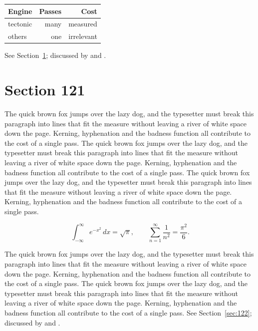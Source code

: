 \documentclass{article}
\begin{document}
\begin{center}
\begin{tabular}{lrr}
\toprule
Engine & Passes & Cost \\
\midrule
tectonic & many & measured \\
others & one & irrelevant \\
\bottomrule
\end{tabular}
\end{center}

See Section~\ref{sec:121}; discussed by \textcite{k1} and \textcite{l3}.
\section{Section 121}
\label{sec:121}
The quick brown fox jumps over the lazy dog, and the typesetter must break this paragraph into lines that fit the measure without leaving a river of white space down the page. Kerning, hyphenation and the badness function all contribute to the cost of a single pass. The quick brown fox jumps over the lazy dog, and the typesetter must break this paragraph into lines that fit the measure without leaving a river of white space down the page. Kerning, hyphenation and the badness function all contribute to the cost of a single pass. The quick brown fox jumps over the lazy dog, and the typesetter must break this paragraph into lines that fit the measure without leaving a river of white space down the page. Kerning, hyphenation and the badness function all contribute to the cost of a single pass. 

\begin{equation}\label{eq:121}
\int_{-\infty}^{\infty} e^{-x^{2}}\,dx = \sqrt{\pi}, \qquad
\sum_{n=1}^{\infty} \frac{1}{n^{2}} = \frac{\pi^{2}}{6}.
\end{equation}

The quick brown fox jumps over the lazy dog, and the typesetter must break this paragraph into lines that fit the measure without leaving a river of white space down the page. Kerning, hyphenation and the badness function all contribute to the cost of a single pass. The quick brown fox jumps over the lazy dog, and the typesetter must break this paragraph into lines that fit the measure without leaving a river of white space down the page. Kerning, hyphenation and the badness function all contribute to the cost of a single pass. 
See Section~\ref{sec:122}; discussed by \textcite{k2} and \textcite{l4}.
\end{document}
